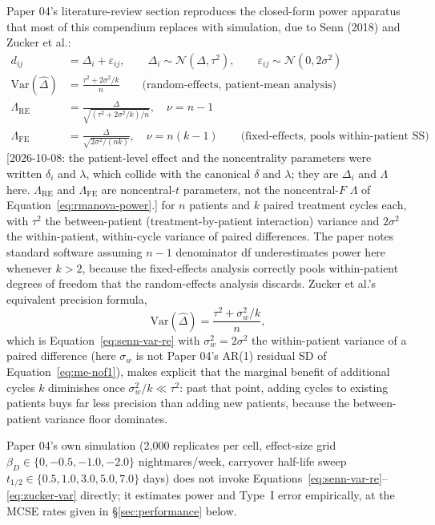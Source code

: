 \documentclass[11pt]{article}
\newcommand{\note}[1]{\textcolor{blue!60!black}{\small [#1]}}
\begin{document}
Paper 04's literature-review section reproduces the closed-form
power apparatus that most of this compendium replaces with simulation,
due to Senn (2018) and Zucker et al.:
\begin{align}
d_{ij} &= \Delta_i + \varepsilon_{ij}, \qquad \Delta_i \sim
  \mathcal N(\Delta,\tau^2), \qquad \varepsilon_{ij}\sim \mathcal N(0, 2\sigma^2)
  \label{eq:senn-model} \\
\mathrm{Var}(\hat\Delta) &= \frac{\tau^2 + 2\sigma^2/k}{n} \qquad
  \text{(random-effects, patient-mean analysis)}
  \label{eq:senn-var-re} \\
\Lambda_{\mathrm{RE}} &= \frac{\Delta}{\sqrt{(\tau^2+2\sigma^2/k)/n}},
  \quad \nu = n-1
  \label{eq:senn-ncp-re} \\
\Lambda_{\mathrm{FE}} &= \frac{\Delta}{\sqrt{2\sigma^2/(nk)}}, \quad
  \nu = n(k-1) \qquad \text{(fixed-effects, pools within-patient SS)}
  \label{eq:senn-ncp-fe}
\end{align}
\note{2026-10-08: the patient-level effect and the noncentrality
parameters were written $\delta_i$ and $\lambda$, which collide with
the canonical $\delta$ and $\lambda$; they are $\Delta_i$ and
$\Lambda$ here. $\Lambda_{\mathrm{RE}}$ and $\Lambda_{\mathrm{FE}}$ are
noncentral-$t$ parameters, not the noncentral-$F$ $\Lambda$ of
Equation~\eqref{eq:rmanova-power}.}
for $n$ patients and $k$ paired treatment cycles each, with $\tau^2$
the between-patient (treatment-by-patient interaction) variance and
$2\sigma^2$ the within-patient, within-cycle variance of paired
differences. The paper notes standard software assuming $n-1$
denominator df underestimates power here whenever $k>2$, because the
fixed-effects analysis correctly pools within-patient degrees of
freedom that the random-effects analysis discards. Zucker et al.'s
equivalent precision formula,
\begin{equation}
\mathrm{Var}(\hat\Delta) = \frac{\tau^2 + \sigma_w^2/k}{n},
\label{eq:zucker-var}
\end{equation}
which is Equation~\eqref{eq:senn-var-re} with $\sigma_w^2 = 2\sigma^2$
the within-patient variance of a paired difference (here $\sigma_w$
is not Paper 04's AR(1) residual SD of
Equation~\eqref{eq:me-nof1}), makes explicit that the marginal benefit of additional cycles $k$
diminishes once $\sigma_w^2/k \ll \tau^2$: past that point, adding
cycles to existing patients buys far less precision than adding new
patients, because the between-patient variance floor dominates.

Paper 04's own simulation (2{,}000 replicates per cell, effect-size
grid $\beta_D\in\{0,-0.5,-1.0,-2.0\}$ nightmares/week, carryover
half-life sweep $t_{1/2}\in\{0.5,1.0,3.0,5.0,7.0\}$ days) does not
invoke Equations~\eqref{eq:senn-var-re}--\eqref{eq:zucker-var}
directly; it estimates power and Type~I error empirically, at the
MCSE rates given in \S\ref{sec:performance} below.
\end{document}

